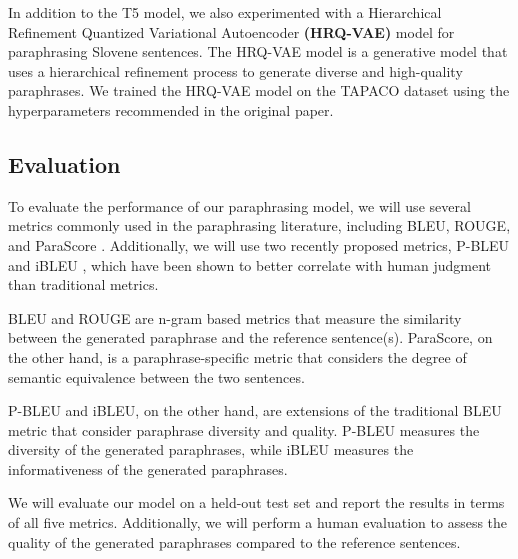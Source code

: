 \documentclass[fleqn,moreauthors,10pt]{ds_report}
\begin{document}
In addition to the T5 model, we also experimented with a Hierarchical Refinement Quantized Variational Autoencoder \textbf{(HRQ-VAE)} model \cite{hosking-etal-2022-hierarchical} for paraphrasing Slovene sentences. The HRQ-VAE model is a generative model that uses a hierarchical refinement process to generate diverse and high-quality paraphrases. We trained the HRQ-VAE model on the TAPACO dataset using the hyperparameters recommended in the original paper.

\subsection*{Evaluation}

To evaluate the performance of our paraphrasing model, we will use several metrics commonly used in the paraphrasing literature, including BLEU, ROUGE, and ParaScore \cite{parascore}. Additionally, we will use two recently proposed metrics, P-BLEU \cite{cao-wan-2020-divgan-pbleu} and iBLEU \cite{ibleu2011}, which have been shown to better correlate with human judgment than traditional metrics.

BLEU and ROUGE are n-gram based metrics that measure the similarity between the generated paraphrase and the reference sentence(s). ParaScore, on the other hand, is a paraphrase-specific metric that considers the degree of semantic equivalence between the two sentences.

P-BLEU and iBLEU, on the other hand, are extensions of the traditional BLEU metric that consider paraphrase diversity and quality. P-BLEU measures the diversity of the generated paraphrases, while iBLEU measures the informativeness of the generated paraphrases.

We will evaluate our model on a held-out test set and report the results in terms of all five metrics. Additionally, we will perform a human evaluation to assess the quality of the generated paraphrases compared to the reference sentences.
 


\end{document}
